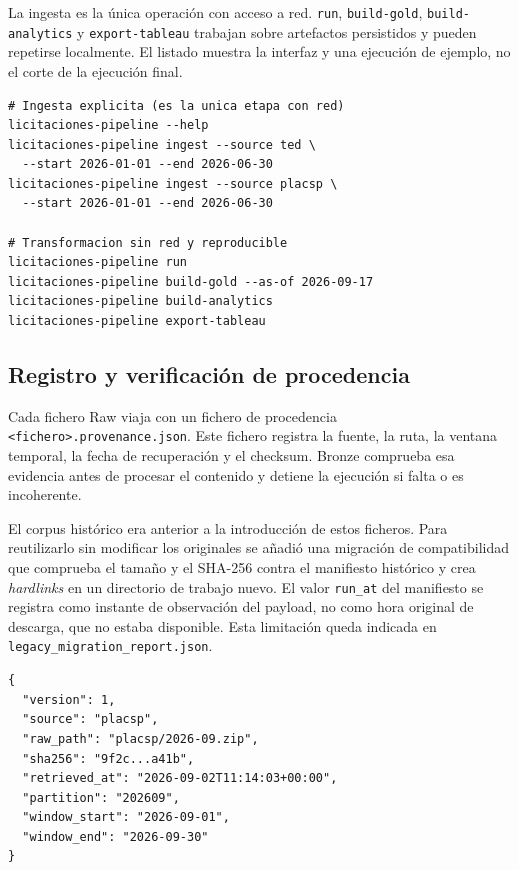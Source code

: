 \documentclass[11pt,a4paper]{article}
\begin{document}
La ingesta es la única operación con acceso a red. \texttt{run},
\texttt{build-gold}, \texttt{build-analytics} y \texttt{export-tableau}
trabajan sobre artefactos persistidos y pueden repetirse localmente. El listado
muestra la interfaz y una ejecución de ejemplo, no el corte de la ejecución final.

\begin{lstlisting}[caption={Interfaz del pipeline (esquema)}]
# Ingesta explicita (es la unica etapa con red)
licitaciones-pipeline --help
licitaciones-pipeline ingest --source ted \
  --start 2026-01-01 --end 2026-06-30
licitaciones-pipeline ingest --source placsp \
  --start 2026-01-01 --end 2026-06-30

# Transformacion sin red y reproducible
licitaciones-pipeline run
licitaciones-pipeline build-gold --as-of 2026-09-17
licitaciones-pipeline build-analytics
licitaciones-pipeline export-tableau
\end{lstlisting}

\subsection{Registro y verificación de procedencia}

Cada fichero Raw viaja con un fichero de procedencia
\texttt{<fichero>.provenance.json}. Este fichero registra la fuente, la ruta,
la ventana temporal, la fecha de recuperación y el checksum. Bronze comprueba
esa evidencia antes de procesar el contenido y detiene la ejecución si falta o
es incoherente.

El corpus histórico era anterior a la introducción de estos ficheros. Para
reutilizarlo sin modificar los originales se añadió una migración de
compatibilidad que comprueba el tamaño y el SHA-256 contra el manifiesto
histórico y crea \emph{hardlinks} en un directorio de trabajo nuevo. El valor
\texttt{run\_at} del manifiesto se registra como instante de observación del
payload, no como hora original de descarga, que no estaba disponible. Esta
limitación queda indicada en \texttt{legacy\_migration\_report.json}.

\Needspace{16\baselineskip}
\begin{lstlisting}[caption={Fichero de procedencia (ejemplo)}]
{
  "version": 1,
  "source": "placsp",
  "raw_path": "placsp/2026-09.zip",
  "sha256": "9f2c...a41b",
  "retrieved_at": "2026-09-02T11:14:03+00:00",
  "partition": "202609",
  "window_start": "2026-09-01",
  "window_end": "2026-09-30"
}
\end{lstlisting}
\end{document}
